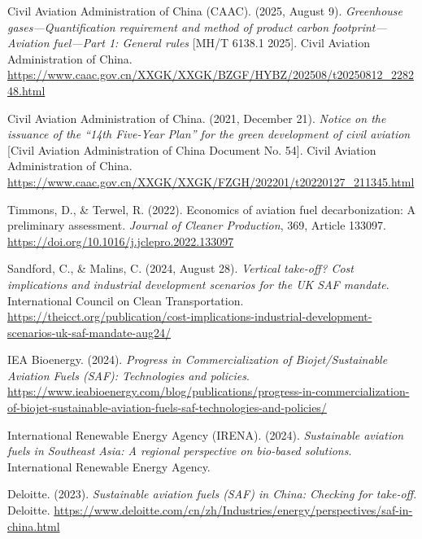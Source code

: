 \documentclass[a4paper,11pt]{article}
\begin{document}
\newpage
\begin{thebibliography}{9}

Civil Aviation Administration of China (CAAC). (2025, August 9). \textit{Greenhouse gases---Quantification requirement and method of product carbon footprint---Aviation fuel---Part 1: General rules} [MH/T 6138.1 2025]. Civil Aviation Administration of China.
\url{https://www.caac.gov.cn/XXGK/XXGK/BZGF/HYBZ/202508/t20250812_228248.html    }

Civil Aviation Administration of China. (2021, December 21). \textit{Notice on the issuance of the ``14th Five-Year Plan'' for the green development of civil aviation} [Civil Aviation Administration of China Document No. 54]. Civil Aviation Administration of China.
\url{https://www.caac.gov.cn/XXGK/XXGK/FZGH/202201/t20220127_211345.html    }

Timmons, D., \& Terwel, R. (2022). Economics of aviation fuel decarbonization: A preliminary assessment. \textit{Journal of Cleaner Production}, 369, Article 133097.
\url{https://doi.org/10.1016/j.jclepro.2022.133097    }

Sandford, C., \& Malins, C. (2024, August 28). \textit{Vertical take-off? Cost implications and industrial development scenarios for the UK SAF mandate}. International Council on Clean Transportation.
\url{https://theicct.org/publication/cost-implications-industrial-development-scenarios-uk-saf-mandate-aug24/    }

IEA Bioenergy. (2024). \textit{Progress in Commercialization of Biojet/Sustainable Aviation Fuels (SAF): Technologies and policies}.
\url{https://www.ieabioenergy.com/blog/publications/progress-in-commercialization-of-biojet-sustainable-aviation-fuels-saf-technologies-and-policies/    }

International Renewable Energy Agency (IRENA). (2024). \textit{Sustainable aviation fuels in Southeast Asia: A regional perspective on bio-based solutions}. International Renewable Energy Agency.

Deloitte. (2023). \textit{Sustainable aviation fuels (SAF) in China: Checking for take-off}. Deloitte.
\url{https://www.deloitte.com/cn/zh/Industries/energy/perspectives/saf-in-china.html    }


\end{thebibliography}
\end{document}
